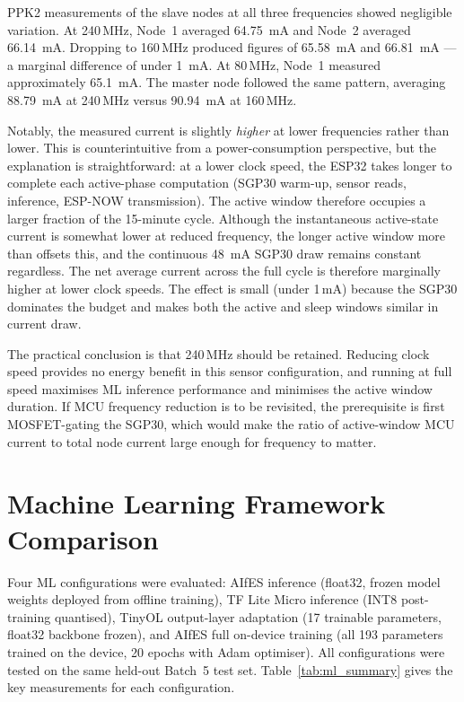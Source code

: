 PPK2 measurements of the slave nodes at all three frequencies showed negligible variation. At 240\,MHz, Node~1 averaged \SI{64.75}{\milli\ampere} and Node~2 averaged \SI{66.14}{\milli\ampere}. Dropping to 160\,MHz produced figures of \SI{65.58}{\milli\ampere} and \SI{66.81}{\milli\ampere} --- a marginal difference of under \SI{1}{\milli\ampere}. At 80\,MHz, Node~1 measured approximately \SI{65.1}{\milli\ampere}. The master node followed the same pattern, averaging \SI{88.79}{\milli\ampere} at 240\,MHz versus \SI{90.94}{\milli\ampere} at 160\,MHz.

Notably, the measured current is slightly \textit{higher} at lower frequencies rather than lower. This is counterintuitive from a power-consumption perspective, but the explanation is straightforward: at a lower clock speed, the ESP32 takes longer to complete each active-phase computation (SGP30 warm-up, sensor reads, inference, ESP-NOW transmission). The active window therefore occupies a larger fraction of the 15-minute cycle. Although the instantaneous active-state current is somewhat lower at reduced frequency, the longer active window more than offsets this, and the continuous \SI{48}{\milli\ampere} SGP30 draw remains constant regardless. The net average current across the full cycle is therefore marginally higher at lower clock speeds. The effect is small (under 1\,mA) because the SGP30 dominates the budget and makes both the active and sleep windows similar in current draw.

The practical conclusion is that 240\,MHz should be retained. Reducing clock speed provides no energy benefit in this sensor configuration, and running at full speed maximises ML inference performance and minimises the active window duration. If MCU frequency reduction is to be revisited, the prerequisite is first MOSFET-gating the SGP30, which would make the ratio of active-window MCU current to total node current large enough for frequency to matter.

\section{Machine Learning Framework Comparison}\label{sec:res_ml}

Four ML configurations were evaluated: AIfES inference (float32, frozen model weights deployed from offline training), TF Lite Micro inference (INT8 post-training quantised), TinyOL output-layer adaptation (17 trainable parameters, float32 backbone frozen), and AIfES full on-device training (all 193 parameters trained on the device, 20 epochs with Adam optimiser). All configurations were tested on the same held-out Batch~5 test set. Table~\ref{tab:ml_summary} gives the key measurements for each configuration.

